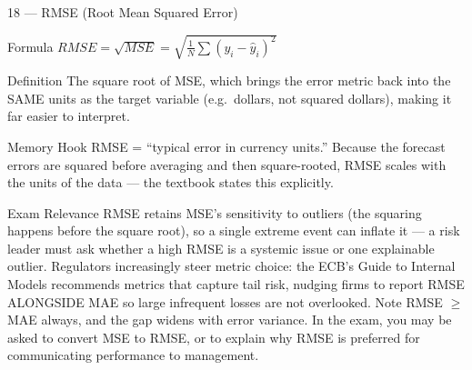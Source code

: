 \documentclass[aspectratio=169,8pt]{beamer}
\begin{document}
	\begin{frame}{18 --- RMSE (Root Mean Squared Error)}
		\begin{block}{Formula}
			$RMSE = \sqrt{MSE} = \sqrt{\frac{1}{N}\sum(y_i - \hat{y}_i)^2}$
		\end{block}
		\begin{block}{Definition}
			The square root of MSE, which brings the error metric back into the SAME units as the target variable (e.g.\ dollars, not squared dollars), making it far easier to interpret.
		\end{block}
		\begin{block}{Memory Hook}
			RMSE = ``typical error in currency units.'' Because the forecast errors are squared before averaging and then square-rooted, RMSE scales with the units of the data --- the textbook states this explicitly.
		\end{block}
		\begin{block}{Exam Relevance}
			RMSE retains MSE's sensitivity to outliers (the squaring happens before the square root), so a single extreme event can inflate it --- a risk leader must ask whether a high RMSE is a systemic issue or one explainable outlier. Regulators increasingly steer metric choice: the ECB's Guide to Internal Models recommends metrics that capture tail risk, nudging firms to report RMSE ALONGSIDE MAE so large infrequent losses are not overlooked. Note RMSE $\geq$ MAE always, and the gap widens with error variance. In the exam, you may be asked to convert MSE to RMSE, or to explain why RMSE is preferred for communicating performance to management.
		\end{block}
	\end{frame}
	
\end{document}
